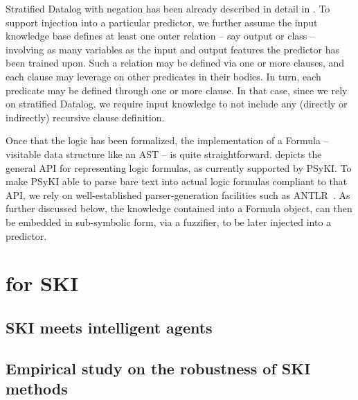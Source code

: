 Stratified Datalog with negation has been already described in detail in .
%
To support injection into a particular predictor, we further assume the input knowledge base defines at least one outer relation -- say output or class -- involving as many variables as the input and output features the predictor has been trained upon.
%
Such a relation may be defined via one or more clauses, and each clause may leverage on other predicates in their bodies.
%
In turn, each predicate may be defined through one or more clause.
%
In that case, since we rely on stratified Datalog, we require input knowledge to not include any (directly or indirectly) recursive clause definition.


Once that the logic has been formalized, the implementation of a Formula -- visitable data structure like an \gls{AST} -- is quite straightforward.
%
 depicts the general API for representing logic formulas, as currently supported by \gls{PSyKI}.
%
To make \gls{PSyKI} able to parse bare text into actual logic formulas compliant to that API, we rely on well-established parser-generation facilities such as ANTLR~\cite{DBLP:journals/spe/ParrQ95}.
%
As further discussed below, the knowledge contained into a Formula object, can then be embedded in sub-symbolic form, via a fuzzifier, to be later injected into a predictor.


\section[Quality of service for SKI]{ for \Gls{SKI}}\label{sec:qos}

\subsection[SKI meets intelligent agents]{\Gls{SKI} meets intelligent agents}\label{subsec:ski-meets-intelligent-agents}
%

\subsection[Empirical study on the robustness of SKI methods]{Empirical study on the robustness of \Gls{SKI} methods}\label{subsec:empirical-study-on-the-robustness-of-ski-methods}
%
